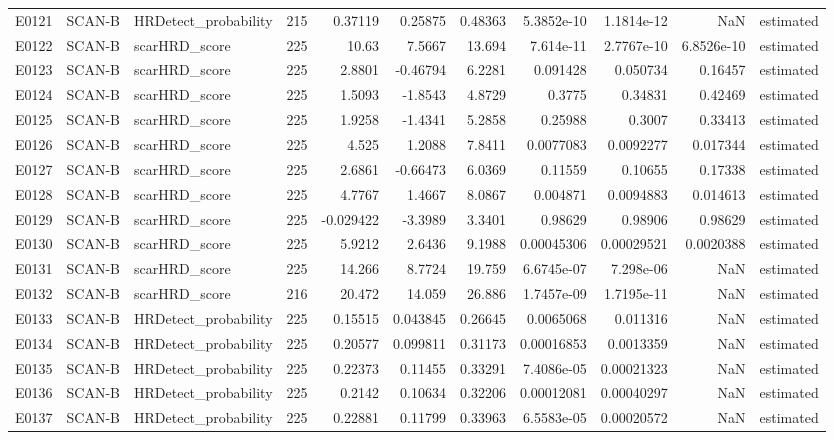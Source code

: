 \begin{longtable}{lllrrrrrrrl}
E0121 & SCAN-B & HRDetect\_probability & 215 & 0.37119 & 0.25875 & 0.48363 & 5.3852e-10 & 1.1814e-12 & NaN & estimated \\
E0122 & SCAN-B & scarHRD\_score & 225 & 10.63 & 7.5667 & 13.694 & 7.614e-11 & 2.7767e-10 & 6.8526e-10 & estimated \\
E0123 & SCAN-B & scarHRD\_score & 225 & 2.8801 & -0.46794 & 6.2281 & 0.091428 & 0.050734 & 0.16457 & estimated \\
E0124 & SCAN-B & scarHRD\_score & 225 & 1.5093 & -1.8543 & 4.8729 & 0.3775 & 0.34831 & 0.42469 & estimated \\
E0125 & SCAN-B & scarHRD\_score & 225 & 1.9258 & -1.4341 & 5.2858 & 0.25988 & 0.3007 & 0.33413 & estimated \\
E0126 & SCAN-B & scarHRD\_score & 225 & 4.525 & 1.2088 & 7.8411 & 0.0077083 & 0.0092277 & 0.017344 & estimated \\
E0127 & SCAN-B & scarHRD\_score & 225 & 2.6861 & -0.66473 & 6.0369 & 0.11559 & 0.10655 & 0.17338 & estimated \\
E0128 & SCAN-B & scarHRD\_score & 225 & 4.7767 & 1.4667 & 8.0867 & 0.004871 & 0.0094883 & 0.014613 & estimated \\
E0129 & SCAN-B & scarHRD\_score & 225 & -0.029422 & -3.3989 & 3.3401 & 0.98629 & 0.98906 & 0.98629 & estimated \\
E0130 & SCAN-B & scarHRD\_score & 225 & 5.9212 & 2.6436 & 9.1988 & 0.00045306 & 0.00029521 & 0.0020388 & estimated \\
E0131 & SCAN-B & scarHRD\_score & 225 & 14.266 & 8.7724 & 19.759 & 6.6745e-07 & 7.298e-06 & NaN & estimated \\
E0132 & SCAN-B & scarHRD\_score & 216 & 20.472 & 14.059 & 26.886 & 1.7457e-09 & 1.7195e-11 & NaN & estimated \\
E0133 & SCAN-B & HRDetect\_probability & 225 & 0.15515 & 0.043845 & 0.26645 & 0.0065068 & 0.011316 & NaN & estimated \\
E0134 & SCAN-B & HRDetect\_probability & 225 & 0.20577 & 0.099811 & 0.31173 & 0.00016853 & 0.0013359 & NaN & estimated \\
E0135 & SCAN-B & HRDetect\_probability & 225 & 0.22373 & 0.11455 & 0.33291 & 7.4086e-05 & 0.00021323 & NaN & estimated \\
E0136 & SCAN-B & HRDetect\_probability & 225 & 0.2142 & 0.10634 & 0.32206 & 0.00012081 & 0.00040297 & NaN & estimated \\
E0137 & SCAN-B & HRDetect\_probability & 225 & 0.22881 & 0.11799 & 0.33963 & 6.5583e-05 & 0.00020572 & NaN & estimated \\

\end{longtable}
